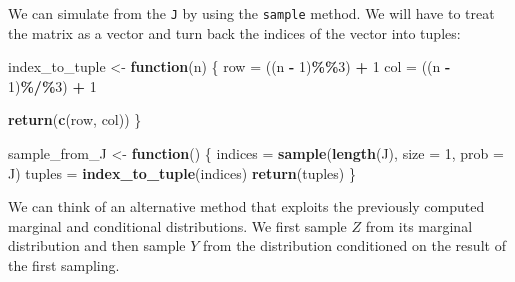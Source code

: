 \documentclass[
]{article}
\newenvironment{Shaded}{\begin{snugshade}}{\end{snugshade}}
\newcommand{\AttributeTok}[1]{\textcolor[rgb]{0.13,0.29,0.53}{#1}}
\newcommand{\ControlFlowTok}[1]{\textcolor[rgb]{0.13,0.29,0.53}{\textbf{#1}}}
\newcommand{\DecValTok}[1]{\textcolor[rgb]{0.00,0.00,0.81}{#1}}
\newcommand{\FunctionTok}[1]{\textcolor[rgb]{0.13,0.29,0.53}{\textbf{#1}}}
\newcommand{\NormalTok}[1]{#1}
\newcommand{\OtherTok}[1]{\textcolor[rgb]{0.56,0.35,0.01}{#1}}
\newcommand{\SpecialCharTok}[1]{\textcolor[rgb]{0.81,0.36,0.00}{\textbf{#1}}}
\begin{document}
We can simulate from the \texttt{J} by using the \texttt{sample} method.
We will have to treat the matrix as a vector and turn back the indices
of the vector into tuples:

\begin{Shaded}
\begin{Highlighting}[]
\NormalTok{index\_to\_tuple }\OtherTok{\textless{}{-}} \ControlFlowTok{function}\NormalTok{(n) \{}
\NormalTok{    row }\OtherTok{=}\NormalTok{ ((n }\SpecialCharTok{{-}} \DecValTok{1}\NormalTok{)}\SpecialCharTok{\%\%}\DecValTok{3}\NormalTok{) }\SpecialCharTok{+} \DecValTok{1}
\NormalTok{    col }\OtherTok{=}\NormalTok{ ((n }\SpecialCharTok{{-}} \DecValTok{1}\NormalTok{)}\SpecialCharTok{\%/\%}\DecValTok{3}\NormalTok{) }\SpecialCharTok{+} \DecValTok{1}

    \FunctionTok{return}\NormalTok{(}\FunctionTok{c}\NormalTok{(row, col))}
\NormalTok{\}}

\NormalTok{sample\_from\_J }\OtherTok{\textless{}{-}} \ControlFlowTok{function}\NormalTok{() \{}
\NormalTok{    indices }\OtherTok{=} \FunctionTok{sample}\NormalTok{(}\FunctionTok{length}\NormalTok{(J), }\AttributeTok{size =} \DecValTok{1}\NormalTok{, }\AttributeTok{prob =}\NormalTok{ J)}
\NormalTok{    tuples }\OtherTok{=} \FunctionTok{index\_to\_tuple}\NormalTok{(indices)}
    \FunctionTok{return}\NormalTok{(tuples)}
\NormalTok{\}}
\end{Highlighting}
\end{Shaded}

We can think of an alternative method that exploits the previously
computed marginal and conditional distributions. We first sample \(Z\)
from its marginal distribution and then sample \(Y\) from the
distribution conditioned on the result of the first sampling.
\end{document}
